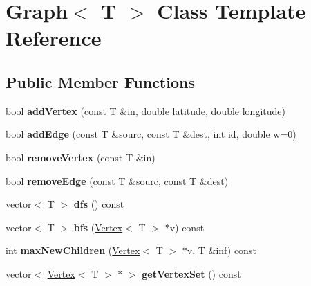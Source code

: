 \hypertarget{class_graph}{}\section{Graph$<$ T $>$ Class Template Reference}
\label{class_graph}
\subsection*{Public Member Functions}
\begin{DoxyCompactItemize}
\item 
bool {\bfseries add\+Vertex} (const T \&in, double latitude, double longitude)\hypertarget{class_graph_a3888c206f0c079105a39bb7beacae340}{}\label{class_graph_a3888c206f0c079105a39bb7beacae340}

\item 
bool {\bfseries add\+Edge} (const T \&sourc, const T \&dest, int id, double w=0)\hypertarget{class_graph_a7b625cd111adc1c08b909cc5330f5c6a}{}\label{class_graph_a7b625cd111adc1c08b909cc5330f5c6a}

\item 
bool {\bfseries remove\+Vertex} (const T \&in)\hypertarget{class_graph_af9c903104ad69a7782979fa9caedf163}{}\label{class_graph_af9c903104ad69a7782979fa9caedf163}

\item 
bool {\bfseries remove\+Edge} (const T \&sourc, const T \&dest)\hypertarget{class_graph_a1106092a37366486cf55576f9ec01692}{}\label{class_graph_a1106092a37366486cf55576f9ec01692}

\item 
vector$<$ T $>$ {\bfseries dfs} () const \hypertarget{class_graph_a3f62ba0e37c5c011299c93d60e3a8be3}{}\label{class_graph_a3f62ba0e37c5c011299c93d60e3a8be3}

\item 
vector$<$ T $>$ {\bfseries bfs} (\hyperlink{class_vertex}{Vertex}$<$ T $>$ $\ast$v) const \hypertarget{class_graph_a0e9598b98be2570eb432690411a577e8}{}\label{class_graph_a0e9598b98be2570eb432690411a577e8}

\item 
int {\bfseries max\+New\+Children} (\hyperlink{class_vertex}{Vertex}$<$ T $>$ $\ast$v, T \&inf) const \hypertarget{class_graph_ab8fd74c3cf8dca6eaa82d39fd1216f52}{}\label{class_graph_ab8fd74c3cf8dca6eaa82d39fd1216f52}

\item 
vector$<$ \hyperlink{class_vertex}{Vertex}$<$ T $>$ $\ast$ $>$ {\bfseries get\+Vertex\+Set} () const \hypertarget{class_graph_ab7dc5ec1c34df811d560021b726e95ec}{}\label{class_graph_ab7dc5ec1c34df811d560021b726e95ec}


\end{DoxyCompactItemize}

